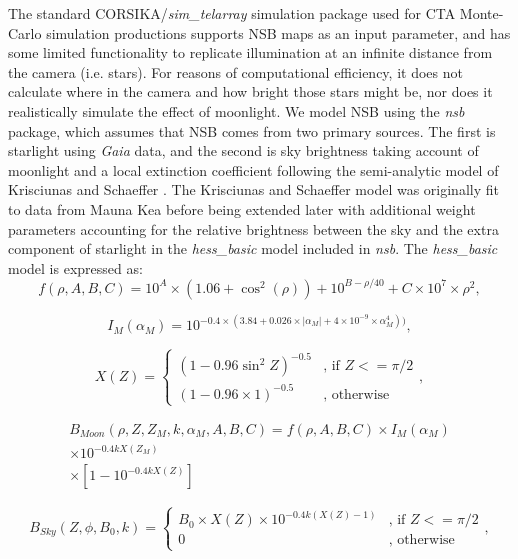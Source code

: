 The standard CORSIKA/\textit{sim\_telarray} simulation package \cite{simtel} used for CTA Monte-Carlo simulation productions supports NSB maps as an input parameter, and has some limited functionality to replicate illumination at an infinite distance from the camera (i.e. stars). For reasons of computational efficiency, it does not calculate where in the camera and how bright those stars might be, nor does it realistically simulate the effect of moonlight. We model NSB using the \textit{nsb} package, which assumes that NSB comes from two primary sources. The first is starlight using \textit{Gaia} data, and the second is sky brightness taking account of moonlight and a local extinction coefficient following the semi-analytic model of Krisciunas and Schaeffer \cite{Krisciunas}. The Krisciunas and Schaeffer model was originally fit to data from Mauna Kea before being extended later with additional weight parameters accounting for the relative brightness between the sky and the extra component of starlight in the \textit{hess\_basic} model included in \textit{nsb}. The \textit{hess\_basic} model is expressed as:
\begin{equation}
    f(\rho, A, B, C) = 10^{A}\times (1.06+\cos^2(\rho))+10^{B-\rho/40}+C \times 10^7 \times \rho^2,
\end{equation}

\begin{equation}
    I_{M} (\alpha_{M}) = 10^{-0.4 \times (3.84 + 0.026 \times |\alpha_{M}| + 4 \times 10^{-9} \times \alpha_{M}^4))},
\end{equation}

\begin{equation}
    X(Z)=\begin{cases} (1-0.96\sin^2 Z)^{-0.5} & \mbox{, if }  Z<=\pi/2 \\ (1 - 0.96 \times 1)^{-0.5} & \mbox{, otherwise } \end{cases},
\end{equation}

\begin{equation}
\begin{aligned}
    B_{Moon}(\rho,Z,Z_{M},k,\alpha_{M},A,B,C)=f(\rho,A,B,C) \times I_{M}(\alpha_{M}) \\ \times 10^{-0.4kX(Z_{M})}\\ \times [1-10^{-0.4 k X(Z)}]
\end{aligned}
\end{equation}

\begin{equation}
    B_{Sky}(Z,\phi,B_0,k)=\begin{cases} B_0\times X(Z) \times 10^{-0.4k(X(Z)-1)} & \mbox{, if }  Z<=\pi/2 \\ 0 & \mbox{, otherwise } \end{cases},
\end{equation}

